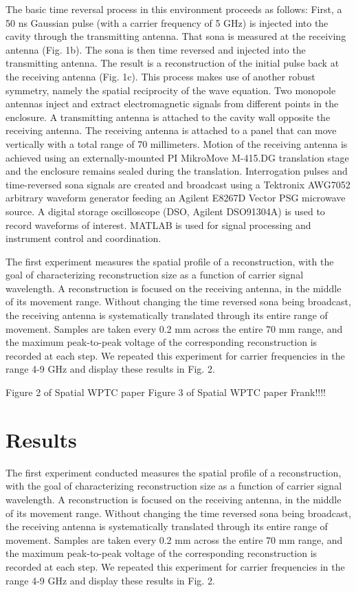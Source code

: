 The basic time reversal process in this environment proceeds as follows: First, a 50 ns Gaussian pulse (with a carrier frequency of 5 GHz) is injected into the cavity through the transmitting antenna. That sona is measured at the receiving antenna (Fig. 1b). The sona is then time reversed and injected into the transmitting antenna. The result is a reconstruction of the initial pulse back at the receiving antenna (Fig. 1c). This process makes use of another robust symmetry, namely the spatial reciprocity of the wave equation.
Two monopole antennas inject and extract electromagnetic signals from different points in the enclosure. A transmitting antenna is attached to the cavity wall opposite the receiving antenna. The receiving antenna is attached to a panel that can move vertically with a total range of 70 millimeters. Motion of the receiving antenna is achieved using an externally-mounted PI MikroMove M-415.DG translation stage and the enclosure remains sealed during the translation. Interrogation pulses and time-reversed sona signals are created and broadcast using a Tektronix AWG7052 arbitrary waveform generator feeding an Agilent E8267D Vector PSG microwave source. A digital storage oscilloscope (DSO, Agilent DSO91304A) is used to record waveforms of interest. MATLAB is used for signal processing and instrument control and coordination.

The first experiment measures the spatial profile of a reconstruction, with the goal of characterizing reconstruction size as a function of carrier signal wavelength. A reconstruction is focused on the receiving antenna, in the middle of its movement range. Without changing the time reversed sona being broadcast, the receiving antenna is systematically translated through its entire range of movement. Samples are taken every 0.2 mm across the entire 70 mm range, and the maximum peak-to-peak voltage of the corresponding reconstruction is recorded at each step. We repeated this experiment for carrier frequencies in the range 4-9 GHz and display these results in Fig. 2.


{Figure 2 of Spatial WPTC paper}
{Figure 3 of Spatial WPTC paper} Frank!!!!

\section{Results}
\label{sec:spatial-profile-results}

The first experiment conducted measures the spatial profile of a reconstruction, with the goal of characterizing reconstruction size as a function of carrier signal wavelength. A reconstruction is focused on the receiving antenna, in the middle of its movement range. Without changing the time reversed sona being broadcast, the receiving antenna is systematically translated through its entire range of movement. Samples are taken every 0.2 mm across the entire 70 mm range, and the maximum peak-to-peak voltage of the corresponding reconstruction is recorded at each step. We repeated this experiment for carrier frequencies in the range 4-9 GHz and display these results in Fig. 2.

